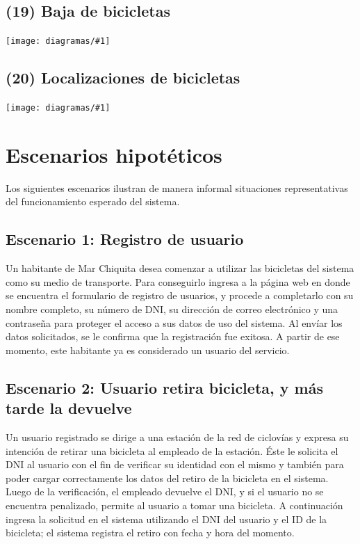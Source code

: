 \documentclass[a4paper, 10pt, twoside]{article}
\newcommand{\diagramah}[1]{
  \texttt{[image: diagramas/\#1]}
}
\begin{document}
\subsection{(19)   Baja de bicicletas}
\diagramah{objetivos-19}

\subsection{(20)   Localizaciones de bicicletas}
\diagramah{objetivos-20}




\section{Escenarios hipotéticos}


Los siguientes escenarios ilustran de manera informal situaciones representativas del funcionamiento esperado del sistema.


\subsection{Escenario 1: Registro de usuario}

Un habitante de Mar Chiquita desea comenzar a utilizar las bicicletas del sistema como su medio de transporte. Para conseguirlo ingresa a la página web en donde se encuentra el formulario de registro de usuarios, y procede a completarlo con su nombre completo, su número de DNI, su dirección de correo electrónico y una contraseña para proteger el acceso a sus datos de uso del sistema. Al envíar los datos solicitados, se le confirma que la registración fue exitosa. A partir de ese momento, este habitante ya es considerado un usuario del servicio.


\subsection{Escenario 2: Usuario retira bicicleta, y más tarde la devuelve}

Un usuario registrado se dirige a una estación de la red de ciclovías y expresa su intención de retirar una bicicleta al empleado de la estación. Éste le solicita el DNI al usuario con el fin de verificar su identidad con el mismo y también para poder cargar correctamente los datos del retiro de la bicicleta en el sistema. Luego de la verificación, el empleado devuelve el DNI, y si el usuario no se encuentra penalizado, permite al usuario a tomar una bicicleta. A continuación ingresa la solicitud en el sistema utilizando el DNI del usuario y el ID de la bicicleta; el sistema registra el retiro con fecha y hora del momento.
\end{document}

